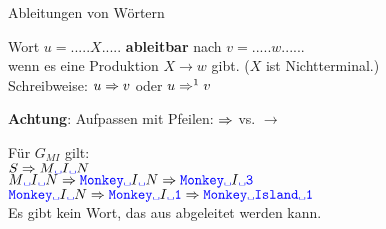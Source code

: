 \begin{frame}{Ableitungen von Wörtern}
	
	\begin{Definition}
		Wort $u = .....X.....$ \textbf{ableitbar} nach $v = ..... w......$ \\
		wenn es eine Produktion $X \to w$ gibt. \; ($X$ ist Nichtterminal.) \\
		Schreibweise: \quad $u \Rightarrow v$ \quad oder \quad $u \Rightarrow^1 v$ \\
	\end{Definition}
	
	\medskip
	\textbf{\alert{Achtung}}: Aufpassen mit Pfeilen: \quad  $\Rightarrow$ vs. $\to$
	
	\pause
	\begin{Beispiel}
		Für $G_{MI}$ gilt: \\
		$S \derives M\word{\sp} I\word{\sp}N$\\
		$ M\word{\sp} I\word{\sp}N \derives \word{Monkey}\word{\sp} I\word{\sp} N \derives \word{Monkey}\word{\sp} I\word{\sp 3}$ \\
		$\word{Monkey}\word{\sp} I\word{\sp} N \derives \word{Monkey}\word{\sp} I\word{\sp 1} \derives \word{Monkey}\word{\sp}\word{Island}\word{\sp 1}$ \\
		Es gibt kein Wort, das aus  abgeleitet werden kann.
	\end{Beispiel}
	
\end{frame}

